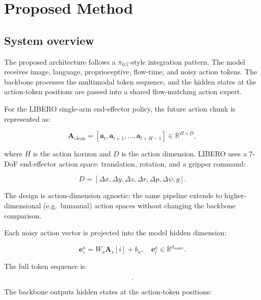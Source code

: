 \documentclass[11pt]{article}
\newcommand{\vect}[1]{\mathbf{#1}}
\newcommand{\Aclean}{\vect{A}_{\mathrm{clean}}}
\newcommand{\As}{\vect{A}_{s}}
\begin{document}
\section{Proposed Method}

\subsection{System overview}

The proposed architecture follows a $\pi_{0.5}$-style integration pattern. The model receives image, language, proprioceptive, flow-time, and noisy action tokens. The backbone processes the multimodal token sequence, and the hidden states at the action-token positions are passed into a shared flow-matching action expert.

For the LIBERO single-arm end-effector policy, the future action chunk is represented as:

\begin{equation}
    \Aclean = [\vect{a}_t, \vect{a}_{t+1}, \ldots, \vect{a}_{t+H-1}] \in \mathbb{R}^{H \times D},
\end{equation}

where $H$ is the action horizon and $D$ is the action dimension. LIBERO uses a 7-DoF end-effector action space: translation, rotation, and a gripper command:

\begin{equation}
D = [\Delta x, \Delta y, \Delta z, \Delta r, \Delta p, \Delta \psi, g].
\end{equation}

The design is action-dimension agnostic; the same pipeline extends to higher-dimensional (e.g.\ bimanual) action spaces without changing the backbone comparison.

Each noisy action vector is projected into the model hidden dimension:

\begin{equation}
    \vect{e}^{a}_i = W_a \As[i] + b_a, \quad \vect{e}^{a}_i \in \mathbb{R}^{d_{model}}.
\end{equation}

The full token sequence is:

\begin{equation}
    [\text{image tokens}, \text{language tokens}, \text{proprio tokens}, \text{flow-time token}, \text{action}_1, \ldots, \text{action}_H].
\end{equation}

The backbone outputs hidden states at the action-token positions:
\end{document}
